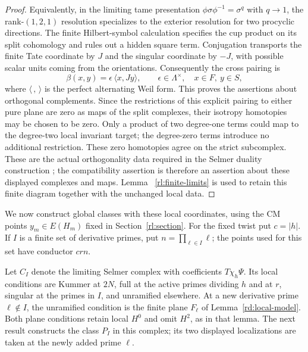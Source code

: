 \begin{proof}
Equivalently, in the limiting tame presentation
\(\phi\sigma\phi^{-1}=\sigma^q\) with \(q\to1\), the
rank-\((1,2,1)\) resolution specializes to the exterior
resolution for two procyclic directions.  The finite
Hilbert-symbol calculation specifies the cup product on
its split cohomology and rules out a hidden square term.
Conjugation transports the finite Tate coordinate by \(J\) and the
singular coordinate by \(-J\), with possible scalar units coming from
the orientations.  Consequently the cross pairing is
\begin{equation}
 \beta(x,y)=\epsilon\,\langle x,Jy\rangle,\qquad
 \epsilon\in\Lambda^\times,\quad x\in F,\ y\in S,
 \label{rd:cross-pairing}
\end{equation}
where \(\langle\, ,\,\rangle\) is the perfect alternating Weil form.
This proves the assertions about orthogonal complements.  Since the
restrictions of this explicit pairing to either pure plane are zero as
maps of the split complexes, their isotropy homotopies may be chosen to
be zero.  Only a product of two degree-one terms could map to the
degree-two local invariant target; the degree-zero terms introduce
no additional restriction.  These zero homotopies agree on the
strict subcomplex.  These are the actual
orthogonality data required in the Selmer duality construction
\cite[Theorem~6.3.4]{Nekovar2006}; the compatibility assertion is therefore
an assertion about these displayed complexes and maps.  Lemma~
\ref{rl:finite-limits} is used to retain this finite diagram together
with the unchanged local data.
\end{proof}

We now construct global classes with these local coordinates, using
the CM points \(y_m\in E(H_m)\) fixed in Section~\ref{rl:section}.
For the fixed twist put
\(c=|h|\).  If \(I\) is a finite set of derivative primes, put
\(n=\prod_{\ell\in I}\ell\); the points used for this set have
conductor \(crn\).

Let \(C_I\) denote the limiting Selmer complex with coefficients
\(T\chi_h\Psi\).  Its local conditions are Kummer at \(2N\), full
at the active primes dividing \(h\) and at \(r\), singular at the
primes in \(I\), and unramified elsewhere.  At a new derivative
prime \(\ell\notin I\), the unramified condition is the finite
plane \(F_\ell\) of Lemma~\ref{rd:local-model}.  Both plane
conditions retain local \(H^0\) and omit \(H^2\), as in that
lemma.  The next result constructs the class \(P_I\) in this
complex; its two displayed localizations are taken at the newly added
prime \(\ell\).

